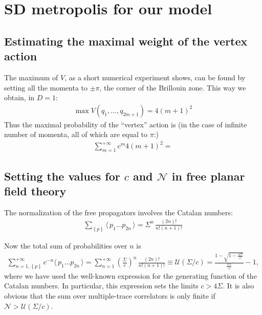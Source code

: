 \documentclass[12pt]{article}
\newcommand{\lr}[1]{ \left( #1 \right) }
\newcommand{\lrc}[1]{ \left\{ #1 \right\} }
\newcommand{\vev}[1]{ \langle \, #1 \, \rangle }
\begin{document}
\section{SD metropolis for our model}

\subsection{Estimating the maximal weight of the vertex action}

The maximum of $V$, as a short numerical experiment shows, can be found by setting all the momenta to $\pm \pi$, the corner of the Brillouin zone. This way we obtain, in $D=1$:
\begin{eqnarray}
\label{vertex_max}
 \max{V\lr{q_1, \ldots, q_{2m+1}}} = 4 \lr{m+1}^2
\end{eqnarray}
Thus the maximal probability of the ``vertex'' action is (in the case of infinite number of momenta, all of which are equal to $\pi$:)
\begin{eqnarray}
\label{vertex_max_prob}
 \sum\limits_{m=1}^{+\infty} c^m 4 \lr{m+1}^2 =
\end{eqnarray}

\subsection{Setting the values for $c$ and $\mathcal{N}$ in free planar field theory}

The normalization of the free propagators involves the Catalan numbers:
\begin{eqnarray}
\label{free_greenfunc_normalizations}
 \sum\limits_{\lrc{p}} \vev{p_1 \ldots p_{2n}} = \Sigma^n \, \frac{\lr{2 n}!}{n! \lr{n+1}!}
\end{eqnarray}

Now the total sum of probabilities over $n$ is
\begin{eqnarray}
\label{free_greenfunc_normalizations}
 \sum\limits_{n=1,\lrc{p}}^{+\infty} c^{-n} \vev{p_1 \ldots p_{2n}}
 =
 \sum\limits_{n=1}^{+\infty}
 \lr{\frac{\Sigma}{c}}^n \, \frac{\lr{2 n}!}{n! \lr{n+1}!}
 \equiv \mathcal{U}\lr{\Sigma/c} =
 \frac{1 - \sqrt{1 - \frac{4 \Sigma}{c}}}{\frac{2 \Sigma}{c}} - 1 ,
\end{eqnarray}
where we have used the well-known expression for the generating function of the Catalan numbers. In particular, this expression sets the limits $c > 4 \Sigma$. It is also obvious that the sum over multiple-trace correlators is only finite if $\mathcal{N} > \mathcal{U}\lr{\Sigma/c} $.
\end{document}
